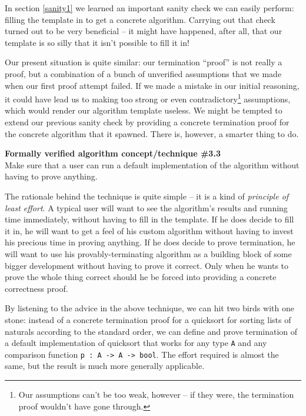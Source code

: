 \documentclass[declaration,mgr,english,shortabstract]{iithesis}
\newcommand{\m}[1]{\texttt{#1}}
\begin{document}
In section \ref{sanity1} we learned an important sanity check we can easily perform: filling the template in to get a concrete algorithm. Carrying out that check turned out to be very beneficial -- it might have happened, after all, that our template is so silly that it isn't possible to fill it in!

Our present situation is quite similar: our termination ``proof'' is not really a proof, but a combination of a bunch of unverified assumptions that we made when our first proof attempt failed. If we made a mistake in our initial reasoning, it could have lead us to making too strong or even contradictory\footnote{Our assumptions can't be too weak, however -- if they were, the termination proof wouldn't have gone through.} assumptions, which would render our algorithm template useless. We might be tempted to extend our previous sanity check by providing a concrete termination proof for the concrete algorithm that it spawned. There is, however, a smarter thing to do.

\begin{center}
    \textbf{Formally verified algorithm concept/technique \#3.3} \\
    Make sure that a user can run a default implementation of the algorithm without having to prove anything.
\end{center}

The rationale behind the technique is quite simple -- it is a kind of \textit{principle of least effort}. A typical user will want to see the algorithm's results and running time immediately, without having to fill in the template. If he does decide to fill it in, he will want to get a feel of his custom algorithm without having to invest his precious time in proving anything. If he does decide to prove termination, he will want to use his provably-terminating algorithm as a building block of some bigger development without having to prove it correct. Only when he wants to prove the whole thing correct should he be forced into providing a concrete correctness proof.

By listening to the advice in the above technique, we can hit two birds with one stone: instead of a concrete termination proof for a quicksort for sorting lists of naturals according to the standard order, we can define and prove termination of a default implementation of quicksort that works for any type \m{A} and any comparison function \m{p\ :\ A -> A -> bool}. The effort required is almost the same, but the result is much more generally applicable.
\end{document}
